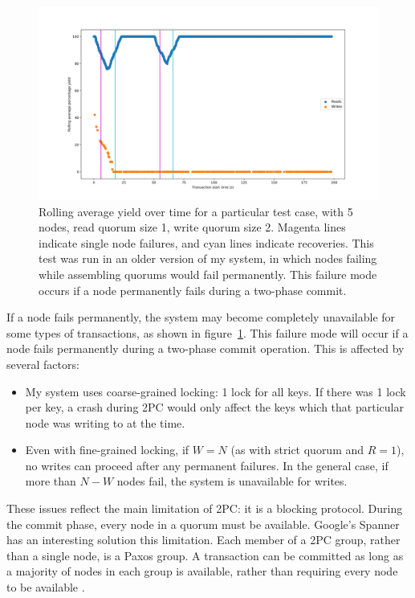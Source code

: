 \documentclass[12pt,a4paper,twoside,openany]{report}
\begin{document}
\begin{figure}[htb]
\centerline{\includegraphics[width=\linewidth]{figs/culprit.png}}
\caption{Rolling average yield over time for a particular test case, with 5 nodes, read quorum size 1, write quorum size 2. Magenta lines indicate single node failures, and cyan lines indicate recoveries. This test was run in an older version of my system, in which nodes failing while assembling quorums would fail permanently. This failure mode occurs if a node permanently fails during a two-phase commit.}
\label{culprit}
\end{figure}

If a node fails permanently, the system may become completely unavailable for some types of transactions, as shown in figure~\ref{culprit}. This failure mode will occur if a node fails permanently during a two-phase commit operation. This is affected by several factors:

\begin{itemize}
\item
My system uses coarse-grained locking: 1 lock for all keys. If there was 1 lock per key, a crash during 2PC would only affect the keys which that particular node was writing to at the time.

\item
Even with fine-grained locking, if $W = N$ (as with strict quorum and $R = 1$), no writes can proceed after any permanent failures. In the general case, if more than $N - W$ nodes fail, the system is unavailable for writes.

\end{itemize}

These issues reflect the main limitation of 2PC: it is a blocking protocol. During the commit phase, every node in a quorum must be available.
Google's Spanner has an interesting solution this limitation. Each member of a 2PC group, rather than a single node, is a Paxos group. A transaction can be committed as long as a majority of nodes in each group is available, rather than requiring every node to be available \cite{45855}.
\end{document}

